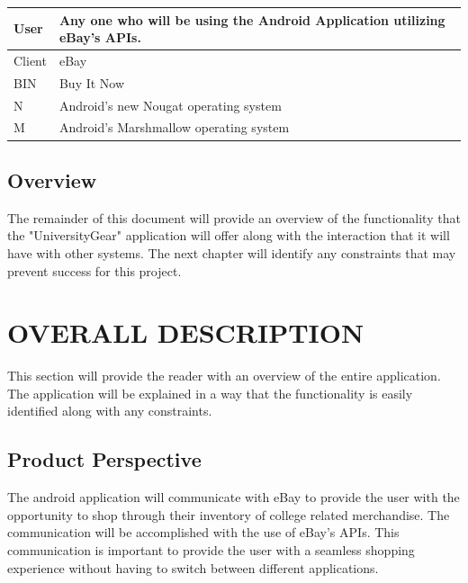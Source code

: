 \documentclass[journal,compsoc, 10pt, draftclsnofoot, onecolumn]{IEEEtran}
\begin{document}
\begin{table}[]
\begin{tabularx}{\textwidth}{l|X}
User                   	      & Any one who will be using the Android Application utilizing eBay's APIs.                                                      \\ \hline
Client                 	      & eBay                                                                                                                          \\ \hline
BIN                    	      & Buy It Now                                                                                                                    \\ \hline
N                   	      & Android's new Nougat operating system 
\\ \hline
M                   	      & Android's Marshmallow operating system                                                                                                                   
\\ \hline
\end{tabularx}
\end{table}

\newpage

\subsection{Overview}

The remainder of this document will provide an overview of the functionality 
that the "UniversityGear" application will offer along with the 
interaction that it will have with other systems. The next chapter will identify
 any constraints that may prevent success for this project.

\section{OVERALL DESCRIPTION}

This section will provide the reader with an overview of the entire application.
 The application will be explained in a way that the functionality is easily 
identified along with any constraints.

\subsection{Product Perspective}

The android application will communicate with eBay to provide the user with the 
opportunity to shop through their inventory of college related merchandise. The 
communication will be accomplished with the use of eBay's APIs. This 
communication is important to provide the user with a seamless shopping 
experience without having to switch between different applications.\newline
\end{document}
